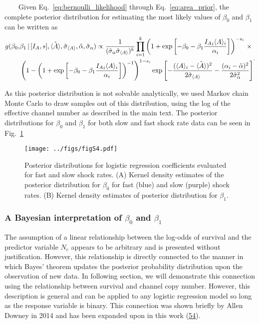 ~~~~Given
Eq.~\ref{eq:bernoulli_likelihood}
through
Eq.~\ref{eq:area_prior},
the
complete
posterior
distribution
for
estimating
the
most
likely
values
of
\(\beta_0\)
and
\(\beta_1\)
can be
written
as
\begin{equation}
\begin{aligned}
g(\beta_0, &\beta_1\,\vert\,[I_A, s],\tilde{\langle A \rangle}, \tilde{\sigma}_{\langle A \rangle}, \tilde{\alpha}, \tilde{\sigma}_\alpha) \propto{1 \over (\tilde{\sigma}_\alpha\tilde{\sigma}_{\langle A \rangle})^k}\prod\limits_{i=1}^k\left(1 + \exp\left[-\beta_0 - \beta_1 {{I_A}_i \langle A \rangle_i \over \alpha_i}\right]\right)^{-s_i}\,\times\,\\
&\left(1 - \left(1 + \exp\left[-\beta_0 - \beta_1 {{I_A}_i\langle A \rangle_i \over \alpha_i}\right]\right)^{-1}\right)^{1 - s_i}
\exp\left[-{(\langle A \rangle_i - \tilde{\langle A \rangle})^2 \over 2\tilde{\sigma}_{\langle A \rangle}} - {(\alpha_i - \tilde{\alpha})^2\over 2\tilde{\sigma}_\alpha^2}\right]
\end{aligned}.
\label{eq:logistic_posterior}\end{equation}

As
this
posterior
distribution
is not
solvable
analytically,
we
used
Markov
chain
Monte
Carlo
to
draw
samples
out of
this
distribution,
using
the
log of
the
effective
channel
number
as
described
in the
main
text.
The
posterior
distributions
for
\(\beta_0\)
and
\(\beta_1\)
for
both
slow
and
fast
shock
rate
data
can be
seen
in
Fig.~\ref{fig:logistic_posterior_distributions}

\begin{figure}
\centering
\texttt{[image: ../figs/figS4.pdf]}
\caption{Posterior
distributions
for
logistic
regression
coefficients
evaluated
for
fast
and
slow
shock
rates.
(A)
Kernel
density
estimates
of the
posterior
distribution
for
\(\beta_0\)
for
fast
(blue)
and
slow
(purple)
shock
rates.
(B)
Kernel
density
estimates
of
posterior
distribution
for
\(\beta_1\).}\label{fig:logistic_posterior_distributions}
\end{figure}

\subsubsection{\texorpdfstring{A
Bayesian
interpretation
of
\(\beta_0\)
and
\(\beta_1\)}{A Bayesian interpretation of \textbackslash{}beta\_0 and \textbackslash{}beta\_1}}\label{a-bayesian-interpretation-of-beta_0-and-beta_1}

The
assumption
of a
linear
relationship
between
the
log-odds
of
survival
and
the
predictor
variable
\(N_c\)
appears
to be
arbitrary
and is
presented
without
justification.
However,
this
relationship
is
directly
connected
to the
manner
in
which
Bayes'
theorem
updates
the
posterior
probability
distribution
upon
the
observation
of new
data.
In
following
section,
we
will
demonstrate
this
connection
using
the
relationship
between
survival
and
channel
copy
number.
However,
this
description
is
general
and
can be
applied
to any
logistic
regression
model
so
long
as the
response
variable
is
binary.
This
connection
was
shown
briefly
by
Allen
Downey
in
2014
and
has
been
expanded
upon
in
this
work
(\protect\hyperlink{ref-downey2014}{54}).

